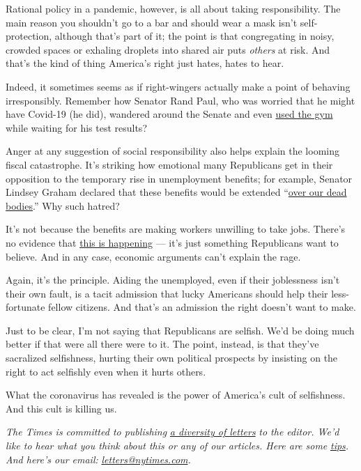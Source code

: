 Rational policy in a pandemic, however, is all about taking
responsibility. The main reason you shouldn't go to a bar and should
wear a mask isn't self-protection, although that's part of it; the point
is that congregating in noisy, crowded spaces or exhaling droplets into
shared air puts \emph{others} at risk. And that's the kind of thing
America's right just hates, hates to hear.

Indeed, it sometimes seems as if right-wingers actually make a point of
behaving irresponsibly. Remember how Senator Rand Paul, who was worried
that he might have Covid-19 (he did), wandered around the Senate and
even
\href{https://www.theatlantic.com/politics/archive/2020/03/rand-paul-coronavirus-test-reckless/608593/}{used
the gym} while waiting for his test results?

Anger at any suggestion of social responsibility also helps explain the
looming fiscal catastrophe. It's striking how emotional many Republicans
get in their opposition to the temporary rise in unemployment benefits;
for example, Senator Lindsey Graham declared that these benefits would
be extended
``\href{https://www.businessinsider.com/lindsey-graham-congress-coronavirus-unemployment-benefit-over-our-dead-bodies-2020-4}{over
our dead bodies}.'' Why such hatred?

It's not because the benefits are making workers unwilling to take jobs.
There's no evidence that
\href{https://twitter.com/ernietedeschi/status/1285687440058064903}{this
is happening} --- it's just something Republicans want to believe. And
in any case, economic arguments can't explain the rage.

Again, it's the principle. Aiding the unemployed, even if their
joblessness isn't their own fault, is a tacit admission that lucky
Americans should help their less-fortunate fellow citizens. And that's
an admission the right doesn't want to make.

Just to be clear, I'm not saying that Republicans are selfish. We'd be
doing much better if that were all there were to it. The point, instead,
is that they've sacralized selfishness, hurting their own political
prospects by insisting on the right to act selfishly even when it hurts
others.

What the coronavirus has revealed is the power of America's cult of
selfishness. And this cult is killing us.

\emph{The Times is committed to publishing}
\href{https://www.nytimes.com/2019/01/31/opinion/letters/letters-to-editor-new-york-times-women.html}{\emph{a
diversity of letters}} \emph{to the editor. We'd like to hear what you
think about this or any of our articles. Here are some}
\href{https://help.nytimes.com/hc/en-us/articles/115014925288-How-to-submit-a-letter-to-the-editor}{\emph{tips}}\emph{.
And here's our email:}
\href{mailto:letters@nytimes.com}{\emph{letters@nytimes.com}}\emph{.}

